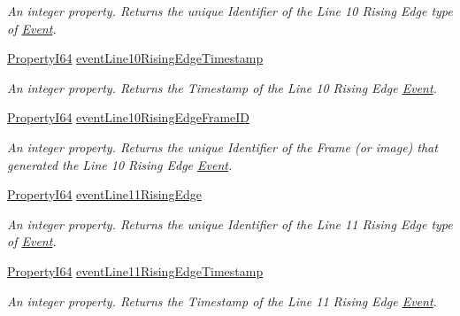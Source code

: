 \begin{DoxyCompactItemize}
\begin{DoxyCompactList}\small\item\em An integer property. Returns the unique Identifier of the Line 10 Rising Edge type of \hyperlink{classmv_i_m_p_a_c_t_1_1acquire_1_1_event}{Event}. \end{DoxyCompactList}\item 
\hyperlink{group___common_interface_ga81749b2696755513663492664a18a893}{Property\+I64} \hyperlink{classmv_i_m_p_a_c_t_1_1acquire_1_1_gen_i_cam_1_1_event_control_afef9e4d3c7065173284a4e3d5f9a2bb1}{event\+Line10\+Rising\+Edge\+Timestamp}
\begin{DoxyCompactList}\small\item\em An integer property. Returns the Timestamp of the Line 10 Rising Edge \hyperlink{classmv_i_m_p_a_c_t_1_1acquire_1_1_event}{Event}. \end{DoxyCompactList}\item 
\hyperlink{group___common_interface_ga81749b2696755513663492664a18a893}{Property\+I64} \hyperlink{classmv_i_m_p_a_c_t_1_1acquire_1_1_gen_i_cam_1_1_event_control_a3bf6a9a85f7d9c7ab9ca2fc452a5cbe3}{event\+Line10\+Rising\+Edge\+Frame\+I\+D}
\begin{DoxyCompactList}\small\item\em An integer property. Returns the unique Identifier of the Frame (or image) that generated the Line 10 Rising Edge \hyperlink{classmv_i_m_p_a_c_t_1_1acquire_1_1_event}{Event}. \end{DoxyCompactList}\item 
\hyperlink{group___common_interface_ga81749b2696755513663492664a18a893}{Property\+I64} \hyperlink{classmv_i_m_p_a_c_t_1_1acquire_1_1_gen_i_cam_1_1_event_control_af04996da2be11c2a0addbf31166782e7}{event\+Line11\+Rising\+Edge}
\begin{DoxyCompactList}\small\item\em An integer property. Returns the unique Identifier of the Line 11 Rising Edge type of \hyperlink{classmv_i_m_p_a_c_t_1_1acquire_1_1_event}{Event}. \end{DoxyCompactList}\item 
\hyperlink{group___common_interface_ga81749b2696755513663492664a18a893}{Property\+I64} \hyperlink{classmv_i_m_p_a_c_t_1_1acquire_1_1_gen_i_cam_1_1_event_control_aefbc4547988bc8a20c71eee0ca026364}{event\+Line11\+Rising\+Edge\+Timestamp}
\begin{DoxyCompactList}\small\item\em An integer property. Returns the Timestamp of the Line 11 Rising Edge \hyperlink{classmv_i_m_p_a_c_t_1_1acquire_1_1_event}{Event}. \end{DoxyCompactList}\item 

\end{DoxyCompactItemize}

